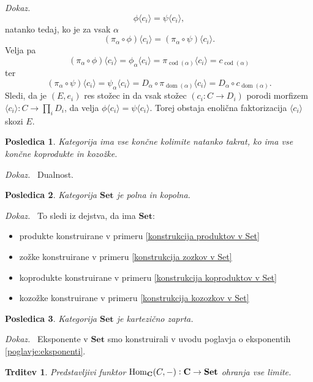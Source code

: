 \documentclass[12pt,a4paper]{book}
\theoremstyle{definition}
\theoremstyle{plain}
\newtheorem{trditev}[definicija]{Trditev}
\newtheorem{posledica}{Posledica}[definicija]
\newenvironment{dokaz}{\emph{Dokaz.}\ }{\hspace{\fill}{$\Box$}}
\theoremstyle{definition}
\theoremstyle{remark}
\newcommand{\cat}[1]{\textbf{#1}}
\DeclareMathOperator{\Hom}{Hom}
\DeclareMathOperator{\dom}{dom}
\DeclareMathOperator{\cod}{cod}
\begin{document}
\begin{dokaz}
$$\phi \langle c_i \rangle = \psi \langle c_i \rangle,$$
natanko tedaj, ko je za vsak $\alpha$
$$(\pi_\alpha \circ \phi) \langle c_i \rangle = (\pi_\alpha \circ \psi) \langle c_i \rangle.$$
Velja pa
$$(\pi_\alpha \circ \phi) \langle c_i \rangle = \phi_\alpha \langle c_i \rangle = \pi_{\cod(\alpha)}\langle c_i \rangle = c_{\cod(\alpha)} $$
ter
$$(\pi_\alpha \circ \psi) \langle c_i \rangle = \psi_\alpha \langle c_i \rangle  = D_\alpha \circ \pi_{\dom(\alpha)} \langle c_i \rangle = D_\alpha \circ c_{\dom(\alpha)}.$$
Sledi, da je $(E, e_i)$ res stožec in da vsak stožec $(c_i : C \to D_i)$ porodi morfizem $\langle c_i \rangle : C \to \prod_i D_i$, da velja $\phi\langle c_i \rangle = \psi \langle c_i \rangle$. Torej obstaja enolična faktorizacija $\langle c_i \rangle$ skozi $E$.
\end{dokaz}

\begin{posledica}
Kategorija ima vse končne kolimite natanko takrat, ko ima vse končne koprodukte in kozožke.
\end{posledica}
\begin{dokaz}
Dualnost.
\end{dokaz}

\begin{posledica}
Kategorija $\cat{Set}$ je polna in kopolna.
\end{posledica}
\begin{dokaz}
To sledi iz dejstva, da ima $\cat{Set}$:
\begin{itemize}
\item produkte konstruirane v primeru \ref{konstrukcija produktov v Set}
\item zožke konstruirane v primeru \ref{konstrukcija zozkov v Set}
\item koprodukte konstruirane v primeru \ref{konstrukcija koproduktov v Set}
\item kozožke konstruirane v primeru \ref{konstrukcija kozozkov v Set}
\end{itemize}
\end{dokaz}

\begin{posledica}
Kategorija $\cat{Set}$ je kartezično zaprta.
\end{posledica}
\begin{dokaz}
Eksponente v $\cat{Set}$ smo konstruirali v uvodu poglavja o eksponentih \autoref{poglavje:eksponenti}.
\end{dokaz}
 
\begin{trditev} Predstavljivi funktor $\Hom_{\bf{C}}(C,-): \bf{C} \to \bf{Set}$ ohranja vse limite.
\end{trditev}
\end{document}
